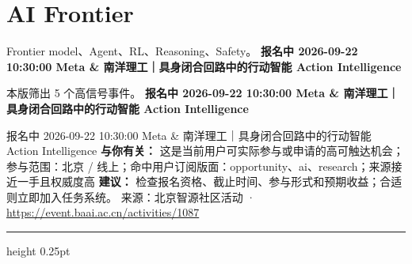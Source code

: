 \documentclass[10.5pt]{ctexart}
\begin{document}
\section*{AI Frontier}
{\color{ormuted} Frontier model、Agent、RL、Reasoning、Safety。}
\vspace{2mm}
{\LARGE\bfseries 报名中 2026-09-22 10:30:00 Meta \& 南洋理工｜具身闭合回路中的行动智能 Action Intelligence}\par
\vspace{1mm}
{\color{ormuted} 本版筛出 5 个高信号事件。}
\vspace{3mm}
{\Large\bfseries 报名中 2026-09-22 10:30:00 Meta \& 南洋理工｜具身闭合回路中的行动智能 Action Intelligence}\par
报名中 2026-09-22 10:30:00 Meta \& 南洋理工｜具身闭合回路中的行动智能 Action Intelligence
\textbf{与你有关：} 这是当前用户可实际参与或申请的高可触达机会；参与范围：北京 / 线上；命中用户订阅版面：opportunity、ai、research；来源接近一手且权威度高
\textbf{建议：} 检查报名资格、截止时间、参与形式和预期收益；合适则立即加入任务系统。
{\footnotesize\color{ormuted} 来源：北京智源社区活动 · \url{https://event.baai.ac.cn/activities/1087}}
\vspace{4mm}
\hrule height 0.25pt
\vspace{3mm}
\end{document}
